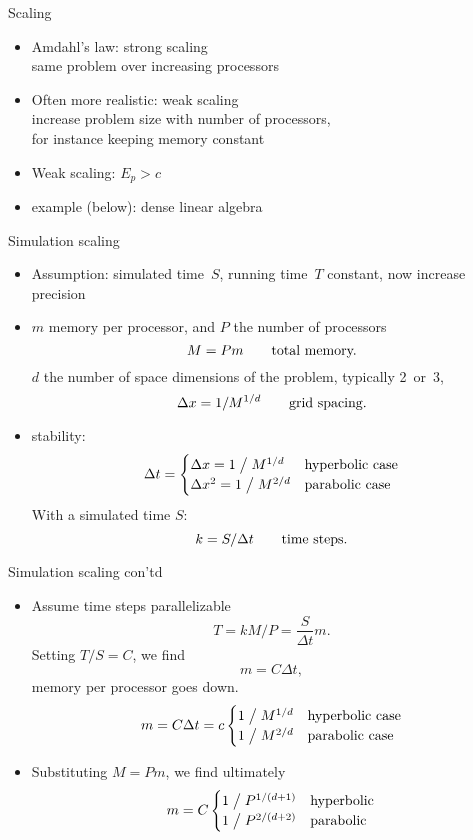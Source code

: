 \begin{numberedframe}{Scaling}
  \begin{itemize}
  \item Amdahl's law: strong scaling\\
    same problem over increasing processors
  \item Often more realistic: weak scaling\\
    increase problem size with number of processors,\\
    for instance keeping memory constant
  \item Weak scaling: $E_p>c$
  \item example (below): dense linear algebra
  \end{itemize}
\end{numberedframe}

\begin{numberedframe}{Simulation scaling}

  \begin{itemize}
  \item Assumption: simulated time~$S$, running time~$T$ constant, now increase precision
  \item  $m$ memory per processor, and $P$ the number of processors
    \[ M=Pm\qquad\hbox{total memory.} \]
    $d$ the number of space dimensions of the problem, typically 2~or~3,
    \[ \Delta x = 1/M^{1/d}\qquad\hbox{grid spacing.} \]
  \item stability:
    \[ \Delta t=
    \begin{cases}
      \Delta x=1\bigm/M^{1/d}&\hbox{hyperbolic case}\\
      \Delta x^2=1\bigm/M^{2/d}&\hbox{parabolic case}
    \end{cases}
    \]
    With a simulated time $S$:
    \[ k=S/\Delta t\qquad \hbox{time steps.} \]
  \end{itemize}     
\end{numberedframe}

\begin{numberedframe}{Simulation scaling con'td}
  \begin{itemize}
  \item Assume time steps parallelizable
    \[ T=kM/P=\frac{S}{\Delta t}m. \]
    Setting $T/S=C$, we find
    \[ m=C\Delta t, \]
    memory per processor goes down.
    \[ m=C\Delta t = c
    \begin{cases}
      1\bigm/M^{1/d}&\hbox{hyperbolic case}\\
      1\bigm/M^{2/d}&\hbox{parabolic case}
    \end{cases}
    \]
  \item Substituting $M=Pm$, we find ultimately
    \[ m = C
    \begin{cases}
      1\bigm/P^{1/(d+1)}&\hbox{hyperbolic}\\
      1\bigm/P^{2/(d+2)}&\hbox{parabolic}
    \end{cases}
    \]
  \end{itemize}
\end{numberedframe}

